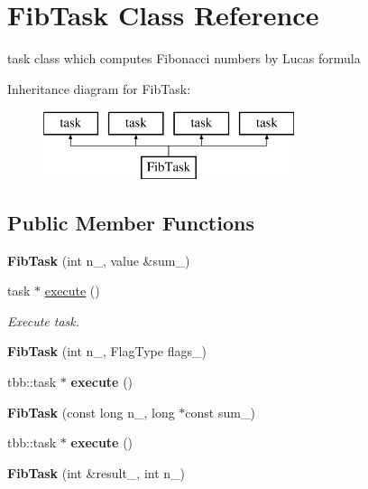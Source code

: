 \hypertarget{structFibTask}{}\section{Fib\+Task Class Reference}
\label{structFibTask}


task class which computes Fibonacci numbers by Lucas formula  


Inheritance diagram for Fib\+Task\+:\begin{figure}[H]
\begin{center}
\leavevmode
\includegraphics[height=2.000000cm]{structFibTask}
\end{center}
\end{figure}
\subsection*{Public Member Functions}
\begin{DoxyCompactItemize}
\item 
\hypertarget{structFibTask_a9ab1716b36ad254af188cb46322fbb3a}{}{\bfseries Fib\+Task} (int n\+\_\+, value \&sum\+\_\+)\label{structFibTask_a9ab1716b36ad254af188cb46322fbb3a}

\item 
\hypertarget{structFibTask_a789d751e934146ab6316ae735a998563}{}task $\ast$ \hyperlink{structFibTask_a789d751e934146ab6316ae735a998563}{execute} ()\label{structFibTask_a789d751e934146ab6316ae735a998563}

\begin{DoxyCompactList}\small\item\em Execute task. \end{DoxyCompactList}\item 
\hypertarget{structFibTask_a81d19adfd89df5cad4fdc3102484c360}{}{\bfseries Fib\+Task} (int n\+\_\+, Flag\+Type flags\+\_\+)\label{structFibTask_a81d19adfd89df5cad4fdc3102484c360}

\item 
\hypertarget{structFibTask_ae336141ea7bfe8c356267361f277709d}{}tbb\+::task $\ast$ {\bfseries execute} ()\label{structFibTask_ae336141ea7bfe8c356267361f277709d}

\item 
\hypertarget{structFibTask_a1b54007de96ac74249ace121d3618f58}{}{\bfseries Fib\+Task} (const long n\+\_\+, long $\ast$const sum\+\_\+)\label{structFibTask_a1b54007de96ac74249ace121d3618f58}

\item 
\hypertarget{structFibTask_ae336141ea7bfe8c356267361f277709d}{}tbb\+::task $\ast$ {\bfseries execute} ()\label{structFibTask_ae336141ea7bfe8c356267361f277709d}

\item 
\hypertarget{structFibTask_a44b2ff4c70791320d333054c7c90493b}{}{\bfseries Fib\+Task} (int \&result\+\_\+, int n\+\_\+)\label{structFibTask_a44b2ff4c70791320d333054c7c90493b}

\end{DoxyCompactItemize}
